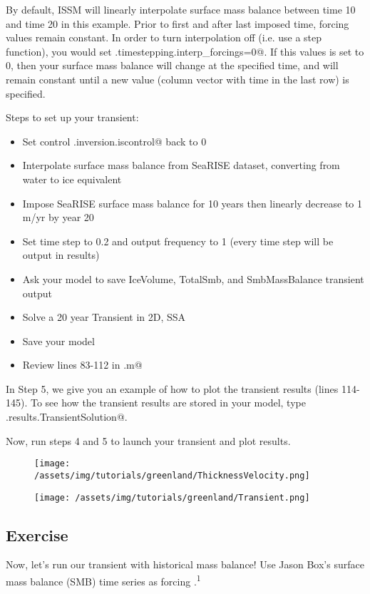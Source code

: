 By default, ISSM will linearly interpolate surface mass balance between time 10 and time 20 in this example. Prior to first and after last imposed time, forcing values remain constant. In order to turn interpolation off (i.e. use a step function), you would set \verb@md.timestepping.interp_forcings=0@. If this values is set to 0, then your surface mass balance will change at the specified time, and will remain constant until a new value (column vector with time in the last row) is specified.

Steps to set up your transient:
\begin{itemize}
	\item Set control \verb@md.inversion.iscontrol@ back to 0
	\item Interpolate surface mass balance from SeaRISE dataset, converting from water to ice equivalent
	\item Impose SeaRISE surface mass balance for 10 years then linearly decrease to 1 m/yr by year 20
	\item Set time step to 0.2 and output frequency to 1 (every time step will be output in results)
	\item Ask your model to save IceVolume, TotalSmb, and SmbMassBalance transient output
	\item Solve a 20 year Transient in 2D, SSA
	\item Save your model
	\item Review lines 83-112 in \verb@runme.m@
\end{itemize}

In Step 5, we give you an example of how to plot the transient results (lines 114-145). To see how the transient results are stored in your model, type \verb@md.results.TransientSolution@.

Now, run steps 4 and 5 to launch your transient and plot results.
\begin{figure}[H]
	\begin{center}
		\texttt{[image: /assets/img/tutorials/greenland/ThicknessVelocity.png]}
	\end{center}
\end{figure}

\begin{figure}[H]
	\begin{center}
		\texttt{[image: /assets/img/tutorials/greenland/Transient.png]}
	\end{center}
\end{figure}
\subsection{Exercise} %
Now, let's run our transient with historical mass balance! Use Jason Box's surface mass balance (SMB) time series as forcing \citep{Box2013a,Box2013b,Box2013c}.\textsuperscript{1}

